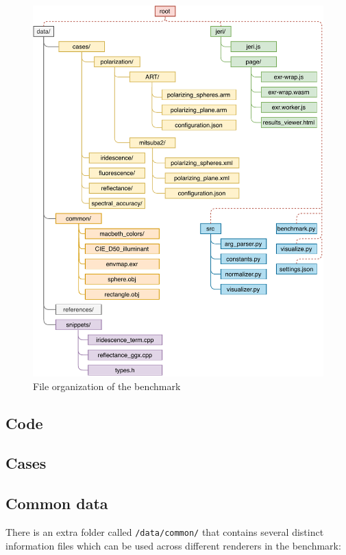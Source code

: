 \begin{figure}
	\centering
	\includegraphics[width=\linewidth]{img/framework.pdf}
	\caption{File organization of the benchmark}
	\label{fig:framework}
\end{figure}

\subsection{Code}

\subsection{Cases}

\subsection{Common data}

There is an extra folder called \texttt{/data/common/} that contains several distinct information files which can be used across different renderers in the benchmark:

